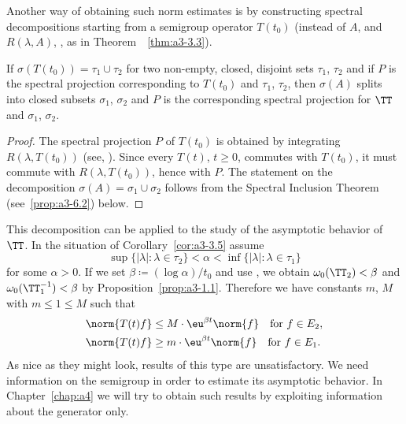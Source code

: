 Another way of obtaining such norm estimates is by constructing spectral decompositions starting from a semigroup operator $T(t_{0})$ (instead of\/ $A$, and $R(\lambda,A)$, \resp, as in Theorem~~\ref{thm:a3-3.3}).
\begin{corollary}\label{cor:a3-3.5}
If\/ $\sigma(T(t_{0})) = \tau_{1} \cup \tau_{2}$ for two non-empty, closed, disjoint sets $\tau_{1}$, $\tau_{2}$ and if\/ $P$ is the spectral projection corresponding to $T(t_{0})$ and $\tau_{1}$, $\tau_{2}$, then $\sigma(A)$ splits into closed subsets $\sigma_{1}$, $\sigma_{2}$ and $P$ is the corresponding spectral projection for $\TT$ and $\sigma_{1}$, $\sigma_{2}$.
\end{corollary}
\begin{proof}
The spectral projection $P$ of\/ $T(t_{0})$ is obtained by integrating $R(\lambda,T(t_{0}))$ (see, \eg \textcite[Section VII.3]{dunfordschwartz:1958}).
Since every $T(t)$, $t \geq 0$, commutes with $T(t_{0})$, it must commute with $R(\lambda,T(t_{0}))$, hence with $P$.
The statement on the decomposition $\sigma(A) = \sigma_{1} \cup \sigma_{2}$ follows from the Spectral Inclusion Theorem (see~\ref{prop:a3-6.2}) below.
\end{proof}
This decomposition can be applied to the study of the asymptotic behavior of\/ $\TT$. In the situation of Corollary~\ref{cor:a3-3.5} assume
\[
\sup \{|\lambda| \colon \lambda \in \tau_{2}\} < \alpha < \inf \{|\lambda| \colon \lambda \in \tau_{1}\} 
\]
for some $\alpha > 0$. 
If we set $\beta \coloneqq (\log\alpha)/t_{0}$ and use 
\textcite[Chap.I, Theorem~6.5]{pazy:1983}, 
we obtain $\omega_{0}(\TT_{2}) < \beta$ and $\omega_{0}(\TT_{1}^{-1}) < \beta$ by Proposition~\ref{prop:a3-1.1}.
Therefore we have constants $m$, $M$ with $m \le 1 \le M $ such that
\begin{align*}
	\norm{T(t)f} &\leq M \cdot \eu^{\beta t}\norm{f} \quad \text{for } f \in E_{2} , \\
	\norm{T(t)f} &\geq m \cdot \eu^{\beta t}\norm{f} \quad \text{for } f \in E_{1} .
\end{align*}
As nice as they might look, results of this type are unsatisfactory. We need information on the semigroup in order to estimate its asymptotic behavior.
In Chapter~\ref{chap:a4} we will try to obtain such results by exploiting information about the generator only.
